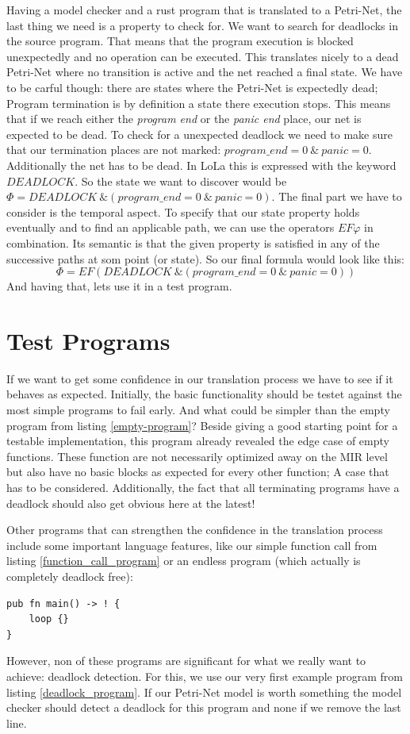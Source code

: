 Having a model checker and a rust program that is translated to a Petri-Net, the last thing we need is a property to check for.
We want to search for deadlocks in the source program.
That means that the program execution is blocked unexpectedly and no operation can be executed.
This translates nicely to a dead Petri-Net where no transition is active and the net reached a final state.
We have to be carful though: there are states where the Petri-Net is expectedly dead;
Program termination is by definition a state there execution stops.
This means that if we reach either the \textit{program end} or the \textit{panic end} place, our net is expected to be dead.
To check for a unexpected deadlock we need to make sure that our termination places are not marked: $program\_end = 0\ \&\ panic = 0$.
Additionally the net has to be dead.
In LoLa this is expressed with the keyword $DEADLOCK$.
So the state we want to discover would be $\Phi=DEADLOCK\ \& (program\_end = 0\ \&\ panic = 0)$.
The final part we have to consider is the temporal aspect.
To specify that our state property holds eventually and to find an applicable path, we can use the operators $EF\varphi$ in combination.
Its semantic is that the given property is satisfied in any of the successive paths at som point (or state).
So our final formula would look like this:
$$\Phi = EF(DEADLOCK\ \& (program\_end = 0\ \&\  panic = 0))$$
And having that, lets use it in a test program.

\section{Test Programs}
\label{app_test}
If we want to get some confidence in our translation process we have to see if it behaves as expected.
Initially, the basic functionality should be testet against the most simple programs to fail early.
And what could be simpler than the empty program from listing \ref{empty-program}?
Beside giving a good starting point for a testable implementation, this program already revealed the edge case of empty functions.
These function are not necessarily optimized away on the MIR level but also have no basic blocks as expected for every other function;
A case that has to be considered.
Additionally, the fact that all terminating programs have a deadlock should also get obvious here at the latest!

Other programs that can strengthen the confidence in the translation process include some important language features, like our simple function call from listing \ref{function_call_program} or an endless program (which actually is completely deadlock free):

\begin{lstlisting}
pub fn main() -> ! {
    loop {}
}
\end{lstlisting}
However, non of these programs are significant for what we really want to achieve: deadlock detection.
For this, we use our very first example program from listing \ref{deadlock_program}.
If our Petri-Net model is worth something the model checker should detect a deadlock for this program and none if we remove the last line.